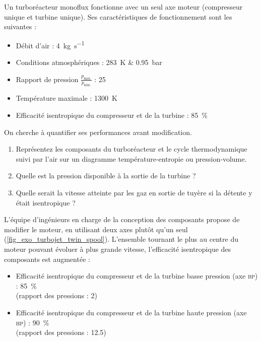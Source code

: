 	Un turboréacteur monoflux fonctionne avec un seul axe moteur (compresseur unique et turbine unique). Ses caractéristiques de fonctionnement sont les suivantes :
		\begin{itemize}
			\item Débit d’air :							\tab \SI{4}{\kilogram\per\second}
			\item Conditions atmosphériques : 		\tab \SI{283}{\kelvin} \& \SI{0,95}{\bar}
			\item Rapport de pression $\frac{p_\text{max.}}{p_\text{min.}}$ : 				\tab \num{25}
			\item Température maximale : 													\tab \SI{1300}{\kelvin}
			\item Efficacité isentropique du compresseur et de la turbine : 	\tab \SI{85}{\percent}
		\end{itemize}
	
	On cherche à quantifier ses performances avant modification.
		\begin{enumerate}
			\item Représentez les composants du turboréacteur et le cycle thermodynamique suivi par l’air sur un diagramme température-entropie ou pression-volume.
			\item Quelle est la pression disponible à la sortie de la turbine ?
			\item Quelle serait la vitesse atteinte par les gaz en sortie de tuyère si la détente y était isentropique ?
		\end{enumerate}
		
		L’équipe d’ingénieurs en charge de la conception des composants propose de modifier le moteur, en utilisant deux axes plutôt qu’un seul (\cref{fig_exo_turbojet_twin_spool}). L’ensemble tournant le plus au centre du moteur pouvant évoluer à plus grande vitesse, l’efficacité isentropique des composants est augmentée :
			\begin{itemize}
				\item Efficacité isentropique du compresseur et de la turbine basse pression (axe \textsc{bp}) : \SI{85}{\percent}\\
					(rapport des pressions : \num{2})
				\item Efficacité isentropique du compresseur et de la turbine haute pression (axe \textsc{hp}) : \SI{90}{\percent}\\
					(rapport des pressions : \num{12,5})
			\end{itemize}
	
